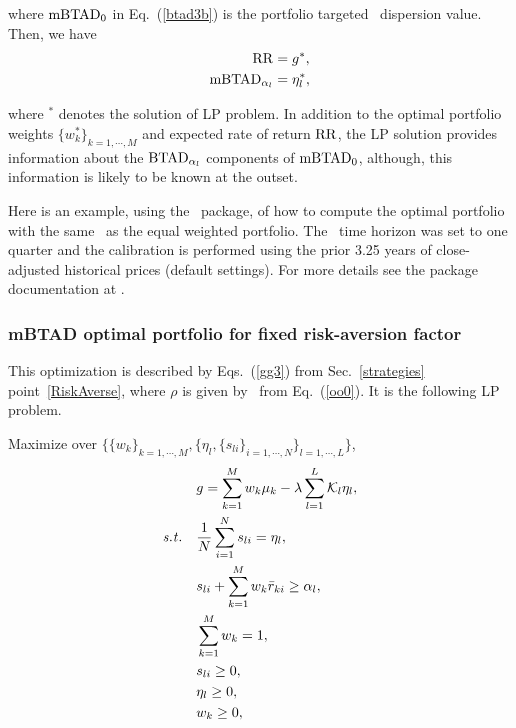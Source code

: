 \noindent where ${\rm mBTAD}_0$ in Eq.~(\ref{btad3b}) is the portfolio targeted \mBTAD\ dispersion value.
Then, we have
\begin{subequations}\label{btad4}
\begin{align}
    \RR &= g^*, \label{btad4a} \\
    \mBTAD_{\alpha_l} &= \eta_l^*, \label{btad4b}
\end{align}
\end{subequations}

\noindent where $^*$ denotes the solution of LP problem.
In addition to the optimal portfolio weights $\{w_k^*\}_{k=1,\cdots,M}$ and expected rate of return ${\rm RR}$,
the LP solution provides information about the ${\rm BTAD}_{\alpha_l}$ components of ${\rm mBTAD}_0$,
although, this information is likely to be known at the outset.

\bigskip
\noindent Here is an example, using the \azapy\ package, of how to compute the optimal portfolio
with the same \mBTAD\ as the equal weighted portfolio.
The \mBTAD\ time horizon was set to one quarter and the calibration is performed using the prior 3.25 years of
close-adjusted historical prices (default settings).
For more details see the package documentation at \azapydoc.



\BackToContents

\subsubsection{mBTAD optimal portfolio for fixed risk-aversion factor}
This optimization is described by Eqs.~(\ref{gg3}) from Sec.~\ref{strategies} point~\ref{RiskAverse},
where $\rho$ is given by \mBTAD\ from Eq.~(\ref{oo0}).
It is the following LP problem.

\bigskip
\noindent Maximize over $\{\{w_k\}_{k=1,\cdots,M}, \{ \eta_l, \{ s_{li} \}_{i=1,\cdots,N} \}_{l=1,\cdots,L} \}$,
\begin{subequations}\label{btad5}
\begin{align}
    &g = \sum_{k=1}^M w_k \mu_k - \lambda \sum_{l=1}^L \cK_l \eta_l, \label{btad5a} \\
    \st & \frac{1}{N} \sum_{i=1}^N s_{li} = \eta_l, \label{btad5b} \\
    & s_{li} + \sum_{k=1}^M w_k \br_{ki} \geq \alpha_l, \label{btad5c} \\
    & \sum_{k=1}^M w_k = 1, \label{btad5d} \\
    & s_{li} \geq 0, \label{btad5f} \\
    & \eta_l \geq 0, \label{btad5g} \\
    & w_k \geq 0, \label{btad5e}
\end{align}
\end{subequations}

